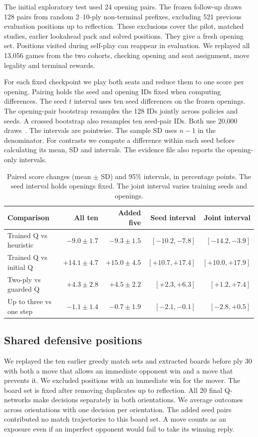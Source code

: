 \documentclass[letterpaper]{article}
\begin{document}
The initial exploratory test used 24 opening pairs. The frozen follow-up
draws 128 pairs from random 2--10-ply non-terminal prefixes, excluding 521
previous evaluation positions up to reflection. These exclusions cover
the pilot, matched studies, earlier lookahead pack and solved positions.
They give a fresh opening set. Positions visited during self-play can
reappear in evaluation. We replayed all 13,056 games from the two cohorts,
checking opening and seat assignment, move legality and terminal rewards.

For each fixed checkpoint we play both seats and reduce them to one
score per opening. Pairing holds the seed and
opening IDs fixed when computing differences. The seed $t$ interval uses
ten seed differences on the frozen openings. The opening-pair bootstrap
resamples the 128 IDs jointly across policies and seeds. A crossed
bootstrap also resamples ten seed-pair IDs. Both use 20,000
draws~\cite{efron1979,agarwal2021}. The intervals are pointwise.
The sample SD uses $n-1$ in the denominator. For contrasts we compute a
difference within each seed before calculating its mean, SD and intervals.
The evidence file also reports the opening-only intervals.

\begin{table}[!htbp]
\centering\small
\caption{Paired score changes (mean $\pm$ SD) and 95\% intervals, in percentage points. The seed interval holds openings fixed. The joint interval varies training seeds and openings.}
\label{tab:control-intervals}
\begin{tabular}{@{}lrrrr@{}}
\toprule
Comparison & All ten & Added five & Seed interval & Joint interval\\
\midrule
Trained Q vs heuristic & $-9.0\pm1.7$ & $-9.3\pm1.5$ & $[-10.2,-7.8]$ & $[-14.2,-3.9]$\\
Trained Q vs initial Q & $+14.1\pm4.7$ & $+15.0\pm4.5$ & $[+10.7,+17.4]$ & $[+10.0,+17.9]$\\
Two-ply vs guarded Q & $+4.3\pm2.8$ & $+4.5\pm2.2$ & $[+2.3,+6.3]$ & $[+1.2,+7.4]$\\
Up to three vs one step & $-1.1\pm1.4$ & $-0.7\pm1.9$ & $[-2.1,-0.1]$ & $[-2.8,+0.5]$\\
\bottomrule
\end{tabular}
\end{table}

\subsection{Shared defensive positions}
We replayed the ten earlier greedy match sets and extracted boards before
ply 30 with both a move that allows an immediate opponent win and a move
that prevents it. We excluded positions with an immediate win for the
mover. The board set is fixed after removing duplicates up to reflection.
All 20 final Q-networks make decisions separately in both orientations.
We average outcomes across orientations with one decision per orientation.
The added seed pairs contributed no match trajectories to this board set. A move counts as an exposure
even if an imperfect opponent would fail to take its winning reply.
\end{document}
